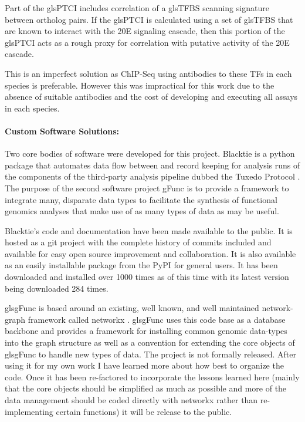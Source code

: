 Part of the gls{PTCI} includes correlation of a gls{TFBS} scanning signature between ortholog pairs.
If the gls{PTCI} is calculated using a set of gls{TFBS} that are known to interact with the 20E signaling cascade, then this portion of the gls{PTCI} acts as a rough proxy for correlation with putative activity of  the 20E cascade.

This is an imperfect solution as ChIP-Seq using antibodies to these TFs in each species is preferable.
However this was impractical for this work due to the absence of suitable antibodies and the cost of developing and executing all assays in each species.


\paragraph{Custom Software Solutions:}

Two core bodies of software were developed for this project.
Blacktie is a python package that automates data flow between and record keeping for analysis runs of the components of the third-party analysis pipeline dubbed the Tuxedo Protocol \cite{Trapnell2012}.
The purpose of the second software project \gls{gFunc} is to provide a framework to integrate many, disparate data types to facilitate the synthesis of functional genomics analyses that make use of as many types of data as may be useful.

Blacktie's code and documentation have been made available to the public.
It is hosted as a git project with the complete history of commits included and available for easy open source improvement and collaboration.
It is also available as an easily installable package from the \gls{PyPI} for general users.
It has been downloaded and installed over 1000 times as of this time with its latest version being downloaded 284 times.

gls{gFunc} is based around an existing, well known, and well maintained network-graph framework called networkx \cite{Hagberg2008}. gls{gFunc} uses this code base as a database backbone and provides a framework for installing common genomic data-types into the graph structure as well as a convention for extending the core objects of gls{gFunc} to handle new types of data.
The project is not formally released.
After using it for my own work I have learned more about how best to organize the code.
Once it has been re-factored to incorporate the lessons learned here (mainly that the core objects should be simplified as much as possible and more of the data management should be coded directly with networkx rather than re-implementing certain functions) it will be release to the public.



